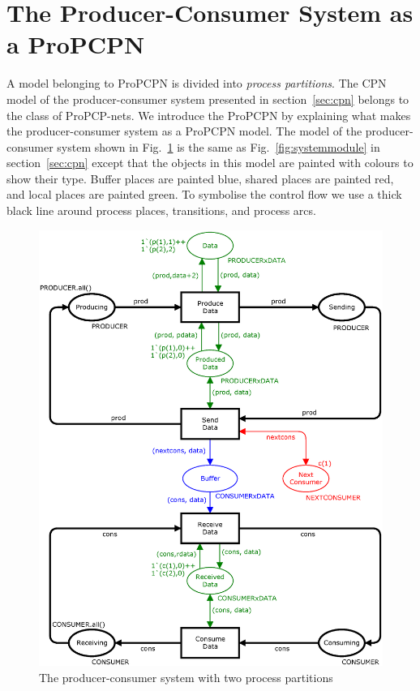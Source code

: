 \section{The Producer-Consumer System as a ProPCPN}
\label{sec:netclassinformal}
A model belonging to ProPCPN is divided into \emph{process partitions}. The CPN model of the producer-consumer system presented in section~\ref{sec:cpn} belongs to the class of ProPCP-nets. We introduce the ProPCPN by explaining what makes the producer-consumer system as a ProPCPN model. The model of the producer-consumer system shown in Fig.~\ref{fig:netclasssystem} is the same as Fig.~\ref{fig:systemmodule} in section~\ref{sec:cpn} except that the objects in this model are painted with colours to show their type. Buffer places are painted blue, shared places are painted red, and local places are painted green. To symbolise the control flow we use a thick black line around process places, transitions, and process arcs.

\begin{figure}[b!]
\centering
\includegraphics[scale=0.5]{netclass/graphics/System.eps}
\caption{The producer-consumer system with two process partitions}
\label{fig:netclasssystem}
\end{figure}

